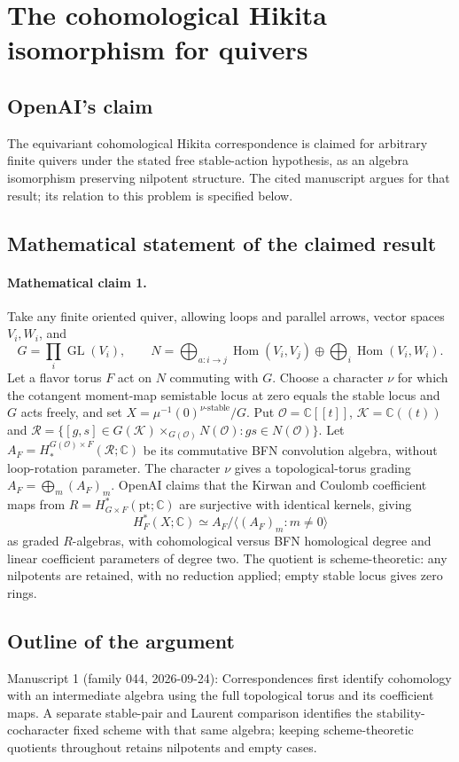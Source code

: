 \documentclass[11pt]{article}
\begin{document}
\section*{The cohomological Hikita isomorphism for quivers}

\subsection{OpenAI's claim}
The equivariant cohomological Hikita correspondence is claimed for arbitrary finite quivers under the stated free stable-action hypothesis, as an algebra isomorphism preserving nilpotent structure. The cited manuscript argues for that result; its relation to this problem is specified below.

\subsection{Mathematical statement of the claimed result}
\paragraph{Mathematical claim 1.} Take any finite oriented quiver, allowing loops and parallel arrows, vector spaces $V_i,W_i$, and
\[
G=\prod_i\operatorname{GL}(V_i),\qquad
N=\bigoplus_{a:i\to j}\operatorname{Hom}(V_i,V_j)\oplus\bigoplus_i\operatorname{Hom}(V_i,W_i).
\]
Let a flavor torus $F$ act on $N$ commuting with $G$. Choose a character $\nu$ for which the cotangent moment-map semistable locus at zero equals the stable locus and $G$ acts freely, and set $X=\mu^{-1}(0)^{\nu\text{-stable}}/G$. Put $\mathcal O=\mathbb C[[t]]$, $\mathcal K=\mathbb C((t))$ and $\mathcal R=\{[g,s]\in G(\mathcal K)\times_{G(\mathcal O)}N(\mathcal O):gs\in N(\mathcal O)\}$. Let $A_F=H_*^{G(\mathcal O)\times F}(\mathcal R;\mathbb C)$ be its commutative BFN convolution algebra, without loop-rotation parameter. The character $\nu$ gives a topological-torus grading $A_F=\bigoplus_m(A_F)_m$.
OpenAI claims that the Kirwan and Coulomb coefficient maps from $R=H^*_{G\times F}(\mathrm{pt};\mathbb C)$ are surjective with identical kernels, giving
\[
H_F^*(X;\mathbb C)\simeq A_F/\langle(A_F)_m:m\ne0\rangle
\]
as graded $R$-algebras, with cohomological versus BFN homological degree and linear coefficient parameters of degree two. The quotient is scheme-theoretic: any nilpotents are retained, with no reduction applied; empty stable locus gives zero rings.

\subsection{Outline of the argument}
Manuscript 1 (family 044, 2026-09-24): Correspondences first identify cohomology with an intermediate algebra using the full topological torus and its coefficient maps. A separate stable-pair and Laurent comparison identifies the stability-cocharacter fixed scheme with that same algebra; keeping scheme-theoretic quotients throughout retains nilpotents and empty cases.
\end{document}
